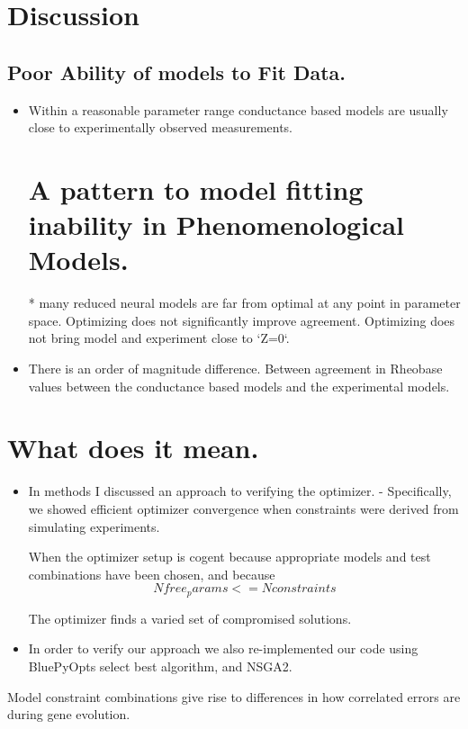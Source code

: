 \section{Discussion}

\subsection{Poor Ability of models to Fit Data.}
\begin{itemize}


\item Within a reasonable parameter range conductance based models are usually close to experimentally observed measurements.

\section{A pattern to model fitting inability in Phenomenological Models.}
* many reduced neural models are far from optimal at any point in parameter space. Optimizing does not significantly improve agreement. Optimizing does not bring model and experiment close to `Z=0`.

\item There is an order of magnitude difference. Between agreement in Rheobase values between the conductance based models and the experimental models. 

\end{itemize}

\section{What does it mean.}
\begin{itemize}

\item  In methods I discussed an approach to verifying the optimizer.
- Specifically, we showed efficient optimizer convergence when constraints were derived from simulating experiments.

When the optimizer setup is cogent because appropriate models and test combinations have been chosen, and because 
\begin{equation}

N free_params <= N constraints
\end{equation}

The optimizer finds a varied set of compromised solutions.

\item  In order to verify our approach we also re-implemented our code using BluePyOpts select best algorithm, and NSGA2.
\end{itemize}

Model constraint combinations give rise to differences in how correlated errors are during gene evolution. 